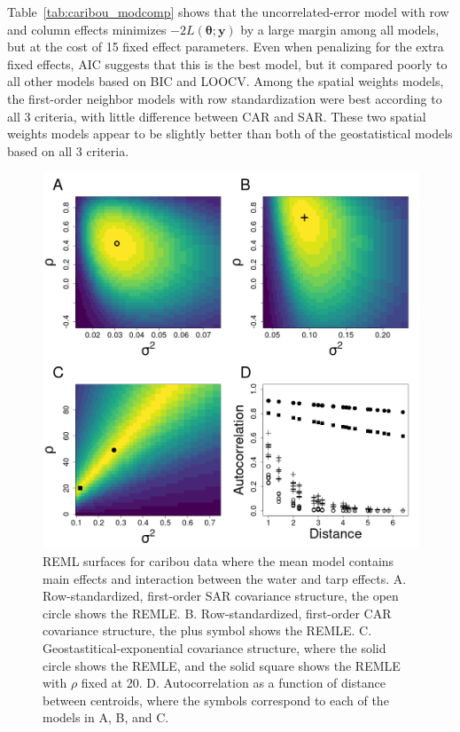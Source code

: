 \documentclass[12pt, titlepage]{article}
\begin{document}
Table~\ref{tab:caribou_modcomp} shows that the uncorrelated-error model with row and column effects minimizes $-2L(\boldsymbol{\theta};\mathbf{y})$ by a large margin among all models, but at the cost of 15 fixed effect parameters.  Even when penalizing for the extra fixed effects, AIC suggests that this is the best model, but it compared poorly to all other models based on BIC and LOOCV.  Among the spatial weights models, the first-order neighbor models with row standardization were best according to all 3 criteria, with little difference between CAR and SAR.  These two spatial weights models appear to be slightly better than both of the geostatistical models based on all 3 criteria.

\begin{figure}[H]
  \begin{center}
	    \includegraphics[width=.8\linewidth]{Caribou_compmod}
  \end{center}
  \caption{REML surfaces for caribou data where the mean model contains main effects and interaction between the water and tarp effects. A. Row-standardized, first-order SAR covariance structure, the open circle shows the REMLE. B. Row-standardized, first-order CAR covariance structure, the plus symbol shows the REMLE. C. Geostastitical-exponential covariance structure, where the solid circle shows the REMLE, and the solid square shows the REMLE with $\rho$ fixed at 20.  D. Autocorrelation as a function of distance between centroids, where the symbols correspond to each of the models in A, B, and C. \label{Fig:Caribou_compmod}}
\end{figure}
\end{document}
